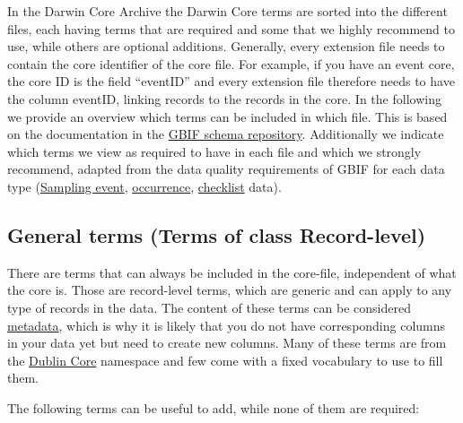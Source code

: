 \documentclass[
]{book}
\begin{document}
In the Darwin Core Archive the Darwin Core terms are sorted into the different files, each having terms that are required and some that we highly recommend to use, while others are optional additions. Generally, every extension file needs to contain the core identifier of the core file. For example, if you have an event core, the core ID is the field ``eventID'' and every extension file therefore needs to have the column eventID, linking records to the records in the core. In the following we provide an overview which terms can be included in which file. This is based on the documentation in the \href{https://rs.gbif.org/extensions.html}{GBIF schema repository}. Additionally we indicate which terms we view as required to have in each file and which we strongly recommend, adapted from the data quality requirements of GBIF for each data type (\href{https://www.gbif.org/data-quality-requirements-sampling-events}{Sampling event}, \href{https://www.gbif.org/data-quality-requirements-occurrences}{occurrence}, \href{https://www.gbif.org/data-quality-requirements-checklists}{checklist} data).

\hypertarget{general-terms-terms-of-class-record-level}{%
\subsection{General terms (Terms of class Record-level)}\label{general-terms-terms-of-class-record-level}}

There are terms that can always be included in the core-file, independent of what the core is. Those are record-level terms, which are generic and can apply to any type of records in the data. The content of these terms can be considered \protect\hyperlink{metadata}{metadata}, which is why it is likely that you do not have corresponding columns in your data yet but need to create new columns. Many of these terms are from the \protect\hyperlink{dublincore}{Dublin Core} namespace and few come with a fixed vocabulary to use to fill them.

The following terms can be useful to add, while none of them are required:
\end{document}

